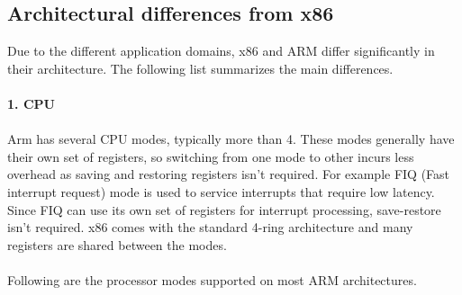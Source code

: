 \documentclass[seminar,twoside]{iitbreport}
\begin{document}
\subsection{Architectural differences from x86}
Due to the different application domains, x86 and ARM differ significantly in their architecture. The following list summarizes the main differences.
\\\\
\textbf{1. CPU}
\\\\
Arm has several CPU modes, typically more than 4. These modes generally have their own set of registers, so switching from one mode to other incurs less overhead as saving and restoring registers isn't required. For example FIQ (Fast interrupt request) mode is used to service interrupts that require low latency. Since FIQ can use its own set of registers for interrupt processing, save-restore isn't required.
x86 comes with the standard 4-ring architecture and many registers are shared between the modes.
\\\\Following are the processor modes supported on most ARM architectures.\\
\end{document}

